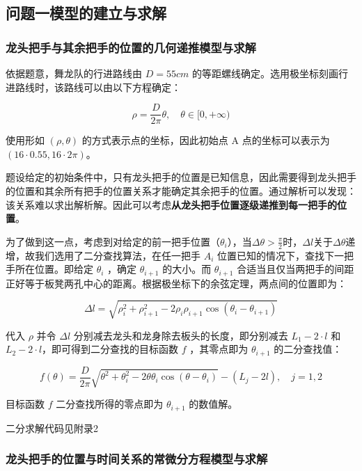 \documentclass[a4paper]{article}
\begin{document}
	\subsection{问题一模型的建立与求解}
	\subsubsection{龙头把手与其余把手的位置的几何递推模型与求解}

		依据题意，舞龙队的行进路线由 $D = 55cm$ 的等距螺线确定。选用极坐标刻画行进路线时，该路线可以由以下方程确定：

		\begin{equation}
			\rho = \frac{D}{2\pi}\theta, \quad \theta \in [0,+\infty)
		\end{equation}

		使用形如 $(\rho, \theta)$ 的方式表示点的坐标，因此初始点 A 点的坐标可以表示为 $( 16 \cdot 0.55, 16 \cdot 2\pi )$。

		题设给定的初始条件中，只有龙头把手的位置是已知信息，因此需要得到龙头把手的位置和其余所有把手的位置关系才能确定其余把手的位置。通过解析可以发现：该关系难以求出解析解。因此可以考虑\textbf{从龙头把手位置逐级递推到每一把手的位置}。

		为了做到这一点，考虑到对给定的前一把手位置（$\theta_{i}$），当$\Delta \theta > \frac{\pi}{2}$时，$\Delta l$关于$\Delta \theta$递增，故我们选用了二分查找算法，在任一把手 $A_i$ 位置已知的情况下，查找下一把手所在位置。即给定 $\theta_{i}$ ，确定 $\theta_{i+1}$ 的大小。而 $\theta_{i+1}$ 合适当且仅当两把手的间距正好等于板凳两孔中心的距离。根据极坐标下的余弦定理，两点间的位置即为：

		$$\Delta l = \sqrt{\rho_i^2 + \rho_{i+1}^2 - 2\rho_i \rho_{i+1} \cos(\theta_i - \theta_{i+1})}$$

		代入 $\rho$ 并令 $\Delta l$ 分别减去龙头和龙身除去板头的长度，即分别减去 $L_1 - 2 \cdot l$ 和 $L_2 - 2 \cdot l$，即可得到二分查找的目标函数 $f$ ，其零点即为 $\theta_{i+1}$ 的二分查找值：

		\begin{equation}
			f(\theta) = \frac{D}{2\pi} \sqrt{\theta^2 + \theta_i^2 - 2\theta \theta_i \cos(\theta - \theta_i)} - (L_j - 2l), \quad j=1, 2
		\end{equation}

		目标函数 $f$ 二分查找所得的零点即为 $\theta_{i+1}$ 的数值解。

		二分求解代码见附录2 %

	\subsubsection{龙头把手的位置与时间关系的常微分方程模型与求解}
\end{document}

